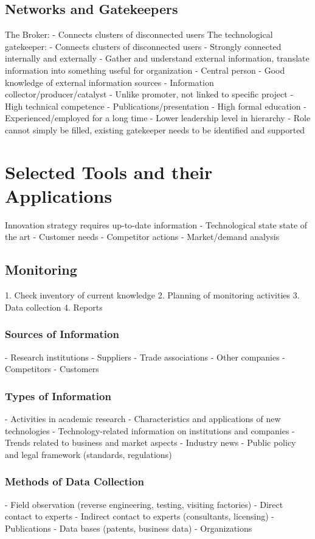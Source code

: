 \documentclass{scrartcl}
\begin{document}
\subsection*{Networks and Gatekeepers}
The Broker:
- Connects clusters of disconnected users
The technological gatekeeper:
- Connects clusters of disconnected users
- Strongly connected internally and externally
- Gather and understand external information, translate information into something useful for organization
- Central person
- Good knowledge of external information sources
- Information collector/producer/catalyst
- Unlike promoter, not linked to specific project
- High technical competence
- Publications/presentation
- High formal education
- Experienced/employed for a long time
- Lower leadership level in hierarchy
- Role cannot simply be filled, existing gatekeeper needs to be identified and supported

\section*{Selected Tools and their Applications}
Innovation strategy requires up-to-date information
- Technological state state of the art
- Customer needs
- Competitor actions
- Market/demand analysis
\subsection*{Monitoring}
1. Check inventory of current knowledge
2. Planning of monitoring activities
3. Data collection
4. Reports
\subsubsection*{Sources of Information}
- Research institutions
- Suppliers
- Trade associations
- Other companies
- Competitors
- Customers
\subsubsection*{Types of Information}
- Activities in academic research
- Characteristics and applications of new technologies
- Technology-related information on institutions and companies
- Trends related to business and market aspects
- Industry news
- Public policy and legal framework (standards, regulations)
\subsubsection*{Methods of Data Collection}
- Field observation (reverse engineering, testing, visiting factories)
- Direct contact to experts
- Indirect contact to experts (consultants, licensing)
- Publications
- Data bases (patents, business data)
- Organizations
\end{document}
